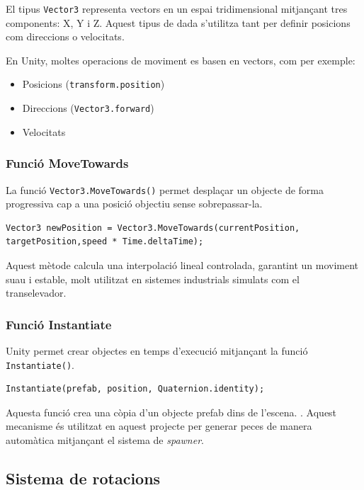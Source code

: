 \documentclass[12pt,a4paper]{report}
\begin{document}
El tipus \texttt{Vector3} representa vectors en un espai tridimensional mitjançant tres components: X, Y i Z. Aquest tipus de dada s'utilitza tant per definir posicions com direccions o velocitats.

En Unity, moltes operacions de moviment es basen en vectors, com per exemple:

\begin{itemize}
\item Posicions (\texttt{transform.position})
\item Direccions (\texttt{Vector3.forward})
\item Velocitats
\end{itemize}

\subsubsection{Funció MoveTowards}

La funció \texttt{Vector3.MoveTowards()} permet desplaçar un objecte de forma progressiva cap a una posició objectiu sense sobrepassar-la.

\begin{lstlisting}[language=CSharp]
Vector3 newPosition = Vector3.MoveTowards(currentPosition, targetPosition,speed * Time.deltaTime);
\end{lstlisting}

Aquest mètode calcula una interpolació lineal controlada, garantint un moviment suau i estable, molt utilitzat en sistemes industrials simulats com el transelevador.


\subsubsection{Funció Instantiate}

Unity permet crear objectes en temps d'execució mitjançant la funció \texttt{Instantiate()}.\cite{UnityInstantiate}
\begin{lstlisting}[language=CSharp]
Instantiate(prefab, position, Quaternion.identity);
\end{lstlisting}

Aquesta funció crea una còpia d'un objecte prefab dins de l'escena. \cite{UnityInstantiate}. Aquest mecanisme és utilitzat en aquest projecte per generar peces de manera automàtica mitjançant el sistema de \textit{spawner}.
\subsection{Sistema de rotacions}
\end{document}

